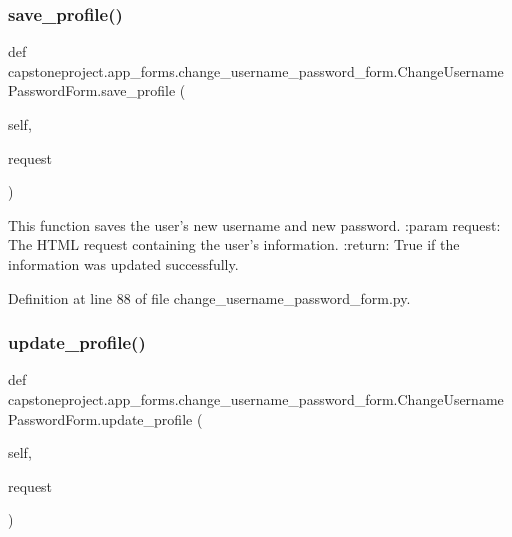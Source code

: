 \subsubsection{\texorpdfstring{save\+\_\+profile()}{save\_profile()}}
{\footnotesize\ttfamily def capstoneproject.\+app\+\_\+forms.\+change\+\_\+username\+\_\+password\+\_\+form.\+Change\+Username\+Password\+Form.\+save\+\_\+profile (\begin{DoxyParamCaption}\item[{}]{self,  }\item[{}]{request }\end{DoxyParamCaption})}

\begin{DoxyVerb}This function saves the user's new username and new password.
:param request: The HTML request containing the user's information.
:return: True if the information was updated successfully.
\end{DoxyVerb}
 

Definition at line 88 of file change\+\_\+username\+\_\+password\+\_\+form.\+py.

\mbox{\label{classcapstoneproject_1_1app__forms_1_1change__username__password__form_1_1_change_username_password_form_ae78e5a74fad9efbe4eceb713a69ce322}} 
\subsubsection{\texorpdfstring{update\+\_\+profile()}{update\_profile()}}
{\footnotesize\ttfamily def capstoneproject.\+app\+\_\+forms.\+change\+\_\+username\+\_\+password\+\_\+form.\+Change\+Username\+Password\+Form.\+update\+\_\+profile (\begin{DoxyParamCaption}\item[{}]{self,  }\item[{}]{request }\end{DoxyParamCaption})}

